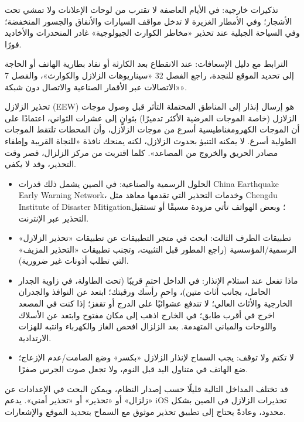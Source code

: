 تذكيرات خارجية: في الأيام العاصفة لا تقترب من لوحات الإعلانات ولا تمشي تحت الأشجار؛ وفي الأمطار الغزيرة لا تدخل مواقف السيارات والأنفاق والجسور المنخفضة؛ وفي السياحة الجبلية عند تحذير «مخاطر الكوارث الجيولوجية» غادر المنحدرات والأخاديد فورًا.

الترابط مع دليل الإسعافات: عند الانقطاع بعد الكارثة أو نفاد بطارية الهاتف أو الحاجة إلى تحديد الموقع للنجدة، راجع الفصل 32 «سيناريوهات الزلازل والكوارث»، والفصل 7 «الاتصالات عبر الأقمار الصناعية والاتصال دون شبكة».


تحذير الزلازل (EEW) هو إرسال إنذار إلى المناطق المحتملة التأثر قبل وصول موجات الزلازل (خاصة الموجات العرضية الأكثر تدميرًا) بثوانٍ إلى عشرات الثواني، اعتمادًا على أن الموجات الكهرومغناطيسية أسرع من موجات الزلازل، وأن المحطات تلتقط الموجات الطولية أسرع. لا يمكنه التنبؤ بحدوث الزلازل، لكنه يمنحك نافذة «للنجاة القريبة وإطفاء مصادر الحريق والخروج من المصاعد». كلما اقتربت من مركز الزلزال، قصر وقت التحذير، وقد لا يكفي.

\begin{itemize}
  \item الحلول الرسمية والصناعية: في الصين يشمل ذلك قدرات China Earthquake Early Warning Network، وخدمات التحذير التي تقدمها معاهد مثل Chengdu Institute of Disaster Mitigation؛ وبعض الهواتف تأتي مزودة مسبقًا أو تستقبل التحذير عبر الإنترنت.
  \item تطبيقات الطرف الثالث: ابحث في متجر التطبيقات عن تطبيقات «تحذير الزلازل» الرسمية/المؤسسية (راجع المطور قبل التثبيت، وتجنب تطبيقات «التحذير المزيف» التي تطلب أذونات غير ضرورية).
  \item ماذا تفعل عند استلام الإنذار: في الداخل احتمِ قريبًا (تحت الطاولة، في زاوية الجدار الحامل، بجانب أثاث متين)، واحمِ رأسك ورقبتك؛ ابتعد عن النوافذ والجدران الخارجية والأثاث العالي؛ لا تندفع عشوائيًا على الدرج أو تقفز؛ إذا كنت في المصعد اخرج في أقرب طابق؛ في الخارج اذهب إلى مكان مفتوح وابتعد عن الأسلاك واللوحات والمباني المتهدمة. بعد الزلزال افحص الغاز والكهرباء وانتبه للهزات الارتدادية.
  \item لا تكتم ولا توقف: يجب السماح لإنذار الزلازل «بكسر» وضع الصامت/عدم الإزعاج؛ ضع الهاتف في متناول اليد قبل النوم، ولا تجعل صوت الجرس صفرًا.
\end{itemize}


قد تختلف المداخل التالية قليلًا حسب إصدار النظام، ويمكن البحث في الإعدادات عن «زلزال» أو «تحذير» أو «تحذير أمني». يدعم iOS تحذيرات الزلازل في الصين بشكل محدود، وعادةً يحتاج إلى تطبيق تحذير موثوق مع السماح بتحديد الموقع والإشعارات.

